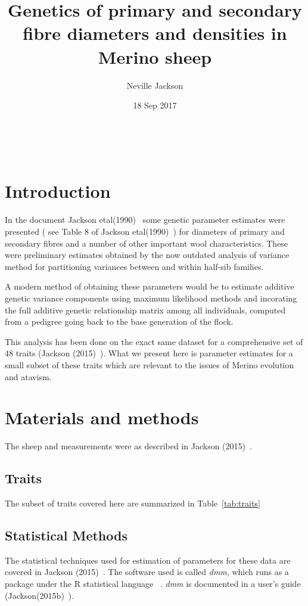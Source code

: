 \documentclass[titlepage]{article}  %
\title{Genetics of primary and secondary fibre diameters and densities in Merino sheep}
\author{Neville Jackson}
\date{18 Sep 2017}
\begin{document}
 


 
\maketitle      
\tableofcontents

$\newcommand{\E}{\mathrm{E}}$
$\newcommand{\Var}{\mathrm{Var}}$
$\newcommand{\Cov}{\mathrm{Cov}}$ 
$\newcommand{\SD}{\mathrm{SD}}$ 

\clearpage
\section{Introduction} 
In the document Jackson etal(1990)~\cite{jack:90} some genetic parameter estimates were presented ( see Table 8 of Jackson etal(1990)~\cite{jack:90}) for diameters of primary and secondary fibres and a number of  other important wool characteristics. These were preliminary estimates obtained by the now outdated analysis of variance method for partitioning variances between and within half-sib families. 

A modern method of obtaining these parameters would be to estimate additive genetic variance components using maximum likelihood methods and incorating the full additive genetic relationship matrix  among all individuals, computed from a pedigree going back to the base generation of the flock. 

This analysis has been done on the exact same dataset for a comprehensive set of 48 traits (Jackson (2015)~\cite{jack:15}). What we present here is parameter estimates for a small subset of these traits which are relevant to the issues of Merino evolution and atavism.

\section{Materials and methods}
The sheep and measurements were as described in Jackson (2015)~\cite{jack:15}.
\subsection{Traits}
The subset of traits covered here are summarized in Table~\ref{tab:traits}


\subsection{Statistical Methods}
The statistical techniques used for estimation of parameters for these data are covered in Jackson (2015)~\cite{jack:15}.  The software used is called {\em dmm}, which runs as a package under the R statistical language ~\cite{rprog:13}. {\em dmm} is documented in a user's guide (Jackson(2015b)~\cite{jack:15b}).
\end{document}
